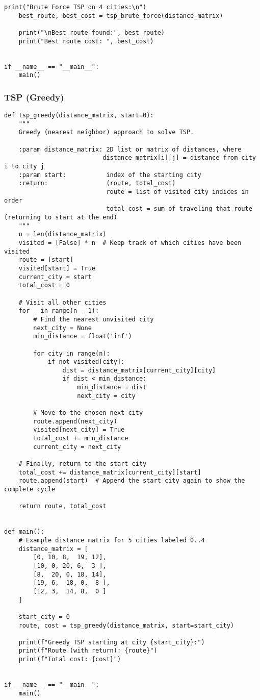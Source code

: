 \documentclass[a4paper,12pt]{article}
\begin{document}
\begin{lstlisting}[style=pythonstyle]
    print("Brute Force TSP on 4 cities:\n")
    best_route, best_cost = tsp_brute_force(distance_matrix)

    print("\nBest route found:", best_route)
    print("Best route cost: ", best_cost)


if __name__ == "__main__":
    main()
\end{lstlisting}

\subsubsection{TSP (Greedy)}
\begin{lstlisting}[style=pythonstyle]
def tsp_greedy(distance_matrix, start=0):
    """
    Greedy (nearest neighbor) approach to solve TSP.
    
    :param distance_matrix: 2D list or matrix of distances, where
                           distance_matrix[i][j] = distance from city i to city j
    :param start:           index of the starting city
    :return:                (route, total_cost)
                            route = list of visited city indices in order
                            total_cost = sum of traveling that route (returning to start at the end)
    """
    n = len(distance_matrix)
    visited = [False] * n  # Keep track of which cities have been visited
    route = [start]
    visited[start] = True
    current_city = start
    total_cost = 0

    # Visit all other cities
    for _ in range(n - 1):
        # Find the nearest unvisited city
        next_city = None
        min_distance = float('inf')

        for city in range(n):
            if not visited[city]:
                dist = distance_matrix[current_city][city]
                if dist < min_distance:
                    min_distance = dist
                    next_city = city

        # Move to the chosen next city
        route.append(next_city)
        visited[next_city] = True
        total_cost += min_distance
        current_city = next_city

    # Finally, return to the start city
    total_cost += distance_matrix[current_city][start]
    route.append(start)  # Append the start city again to show the complete cycle

    return route, total_cost


def main():
    # Example distance matrix for 5 cities labeled 0..4
    distance_matrix = [
        [0, 10, 8,  19, 12],
        [10, 0, 20, 6,  3 ],
        [8,  20, 0, 18, 14],
        [19, 6,  18, 0,  8 ],
        [12, 3,  14, 8,  0 ]
    ]

    start_city = 0
    route, cost = tsp_greedy(distance_matrix, start=start_city)

    print(f"Greedy TSP starting at city {start_city}:")
    print(f"Route (with return): {route}")
    print(f"Total cost: {cost}")


if __name__ == "__main__":
    main()

\end{lstlisting}
\end{document}
